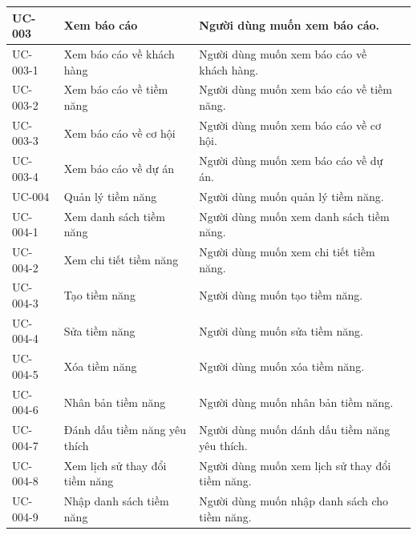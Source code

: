 \documentclass[12pt,a4paper]{article}
\begin{document}
\begin{center}
\begin{longtable}{|p{2.5cm}|p{4.5cm}|p{7.5cm}|c|}
            \\ \hline
            UC-003
            & Xem báo cáo
            & Người dùng muốn xem báo cáo.
            \\ \hline
            UC-003-1
            & Xem báo cáo về khách hàng
            & Người dùng muốn xem báo cáo về khách hàng.
            \\ \hline
            UC-003-2
            & Xem báo cáo về tiềm năng
            & Người dùng muốn xem báo cáo về tiềm năng.
            \\ \hline
            UC-003-3
            & Xem báo cáo về cơ hội
            & Người dùng muốn xem báo cáo về cơ hội.
            \\ \hline
            UC-003-4
            & Xem báo cáo về dự án
            & Người dùng muốn xem báo cáo về dự án.
            \\ \hline
            UC-004
            & Quản lý tiềm năng
            & Người dùng muốn quản lý tiềm năng.
            \\ \hline
            UC-004-1
            & Xem danh sách tiềm năng
            & Người dùng muốn xem danh sách tiềm năng.
            \\ \hline
            UC-004-2
            & Xem chi tiết tiềm năng
            & Người dùng muốn xem chi tiết tiềm năng.
            \\ \hline
            UC-004-3
            & Tạo tiềm năng
            & Người dùng muốn tạo tiềm năng.
            \\ \hline
            UC-004-4
            & Sửa tiềm năng
            & Người dùng muốn sửa tiềm năng.
            \\ \hline
            UC-004-5
            & Xóa tiềm năng
            & Người dùng muốn xóa tiềm năng.
            \\ \hline
            UC-004-6
            & Nhân bản tiềm năng
            & Người dùng muốn nhân bản tiềm năng.
            \\ \hline
            UC-004-7
            & Đánh dấu tiềm năng yêu thích
            & Người dùng muốn dánh dấu tiềm năng yêu thích.
            \\ \hline
            UC-004-8
            & Xem lịch sử thay đổi tiềm năng
            & Người dùng muốn xem lịch sử thay đổi tiềm năng.
            \\ \hline
            UC-004-9
            & Nhập danh sách tiềm năng
            & Người dùng muốn nhập danh sách cho tiềm năng.

\end{longtable}
\end{center}
\end{document}
